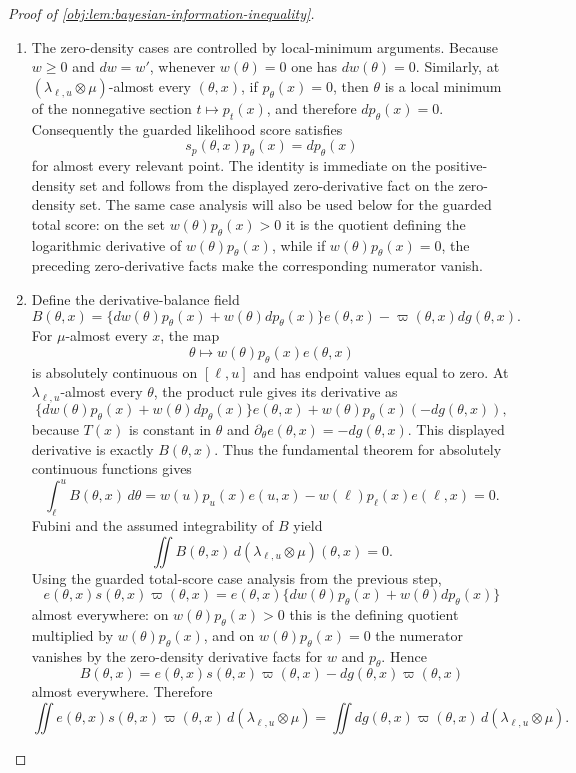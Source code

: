\documentclass[11pt]{article}
\begin{document}
\begin{proof}[Proof of \cref{obj:lem:bayesian-information-inequality}]
\begin{enumerate}
\item The zero-density cases are controlled by local-minimum arguments.  Because \(w\ge0\)
and \(dw=w'\), whenever \(w(\theta)=0\) one has \(dw(\theta)=0\).  Similarly, at
\((\lambda_{\ell,u}\otimes\mu)\)-almost every \((\theta,x)\), if
\(p_\theta(x)=0\), then \(\theta\) is a local minimum of the nonnegative section
\(t\mapsto p_t(x)\), and therefore \(dp_\theta(x)=0\).  Consequently the guarded
likelihood score satisfies
\[
s_p(\theta,x)p_\theta(x)=dp_\theta(x)
\]
for almost every relevant point.  The identity is immediate on the positive-density set
and follows from the displayed zero-derivative fact on the zero-density set.  The same
case analysis will also be used below for the guarded total score: on the set
\(w(\theta)p_\theta(x)>0\) it is the quotient defining the logarithmic derivative of
\(w(\theta)p_\theta(x)\), while if \(w(\theta)p_\theta(x)=0\), the preceding
zero-derivative facts make the corresponding numerator vanish. %

\item Define the derivative-balance field
\[
B(\theta,x)
 =
\{dw(\theta)p_\theta(x)+w(\theta)dp_\theta(x)\}e(\theta,x)
 -
\varpi(\theta,x)dg(\theta,x).
\]
For \(\mu\)-almost every \(x\), the map
\[
\theta\longmapsto w(\theta)p_\theta(x)e(\theta,x)
\]
is absolutely continuous on \([\ell,u]\) and has endpoint values equal to zero.  At
\(\lambda_{\ell,u}\)-almost every \(\theta\), the product rule gives its derivative as
\[
\{dw(\theta)p_\theta(x)+w(\theta)dp_\theta(x)\}e(\theta,x)
+w(\theta)p_\theta(x)(-dg(\theta,x)),
\]
because \(T(x)\) is constant in \(\theta\) and \(\partial_\theta e(\theta,x)=-dg(\theta,x)\).
This displayed derivative is exactly \(B(\theta,x)\).  Thus the fundamental theorem for
absolutely continuous functions gives
\[
\int_\ell^u B(\theta,x)\,d\theta
 =
w(u)p_u(x)e(u,x)-w(\ell)p_\ell(x)e(\ell,x)
 =
0.
\]
Fubini and the assumed integrability of \(B\) yield
\[
\iint B(\theta,x)\,d(\lambda_{\ell,u}\otimes\mu)(\theta,x)=0.
\]
Using the guarded total-score case analysis from the previous step,
\[
e(\theta,x)s(\theta,x)\varpi(\theta,x)
 =
e(\theta,x)\{dw(\theta)p_\theta(x)+w(\theta)dp_\theta(x)\}
\]
almost everywhere: on \(w(\theta)p_\theta(x)>0\) this is the defining quotient
multiplied by \(w(\theta)p_\theta(x)\), and on \(w(\theta)p_\theta(x)=0\) the numerator
vanishes by the zero-density derivative facts for \(w\) and \(p_\theta\).  Hence
\[
B(\theta,x)
 =
e(\theta,x)s(\theta,x)\varpi(\theta,x)-dg(\theta,x)\varpi(\theta,x)
\]
almost everywhere.  Therefore
\[
\iint e(\theta,x)s(\theta,x)\varpi(\theta,x)\,d(\lambda_{\ell,u}\otimes\mu)
 =
\iint dg(\theta,x)\varpi(\theta,x)\,d(\lambda_{\ell,u}\otimes\mu).
\] %


\end{enumerate}
\end{proof}
\end{document}
